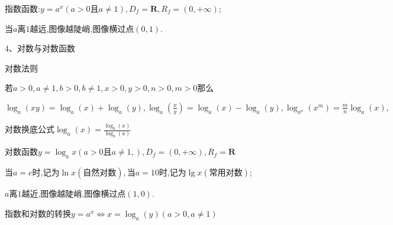 \documentclass[UTF8]{ctexart}
\begin{document}
指数函数:$y=a^{x}(a>0\text{且}a\neq 1),D_{f}=\mathbf{R} ,R_{f}=(0,+\infty )$;

当$a$离$1$越远,图像越陡峭,图像横过点$(0,1)$.

4、对数与对数函数

对数法则

若$a>0,a\neq 1,b>0,b\neq 1,x>0,y>0,n>0,m>0$那么

$\displaystyle \log _{a}(xy)=\log _{a}(x)+\log _{a}(y),\log _{a}(\frac{x}{y})=\log _{a}(x)-\log _{a}(y),\log _{a^n}(x^m)=\frac{m}{n}\log _{a}(x),$

对数换底公式$\displaystyle \log _{a}(x)=\frac{\log _{b}(x)}{\log _{b}(a)}$

对数函数$y=\log _{a}x(a>0\text{且}a\neq 1,),D_{f}=(0,+\infty ) ,R_{f}=\mathbf{R} $

$\text{当}a=e\text{时,记为}\ln x(\text{自然对数}),\text{当}a=10\text{时,记为}\lg x(\text{常用对数})$;

$a$离$1$越近,图像越陡峭,图像横过点$(1,0)$.

指数和对数的转换$y=a^{x}\Leftrightarrow x=\log _{a}(y)(a>0,a\neq 1)$
\end{document}
